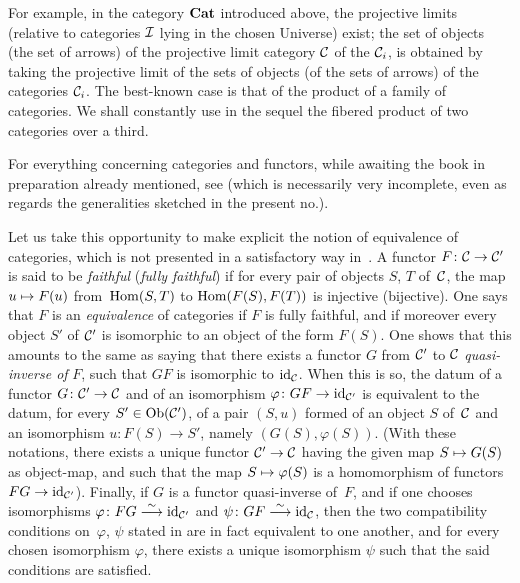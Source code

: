 For example, in the category $\Cat$ introduced above, the
projective limits (relative to categories $\cal{I}$
lying in the chosen Universe) exist; the set of objects
(\resp the set of arrows) of the projective limit
category $\cal{C}$ of the $\cal{C}_i$, is obtained by taking the
projective limit of the sets of objects (\resp of the sets of arrows)
of the categories $\cal{C}_i$. The best-known case is that of the
product of a family of categories. We shall constantly use
in the sequel the fibered product of two categories over a
third.

For everything concerning categories and functors, while
awaiting the book in preparation already mentioned, see
\cite{VI.1} (which is necessarily very incomplete, even as regards
the generalities sketched in the
present no.).

Let us take this opportunity to make explicit the notion of equivalence of
categories,
which is not presented in a satisfactory way
in~\cite{VI.1}. A functor $F\colon\cal{C}\to \cal{C}'$ is said to be
\emph{faithful}
(\resp \emph{fully faithful})
if for every pair of objects $S$, $T$ of~$\cal{C}$, the map
$u\mto F(u)$ from~$\Hom(S,T)$ to $\Hom(F(S),F(T))$ is injective
(\resp bijective). One says that $F$ is an \emph{equivalence} of
categories if
$F$ is fully faithful, and if moreover every object $S'$ of
$\cal{C}'$ is isomorphic to an object of the form $F(S)$. One shows
that this amounts to the same as saying that there exists a functor $G$ from
$\cal{C}'$ to $\cal{C}$ \emph{quasi-inverse of} $F$, \iev such that
$GF$ is isomorphic to $\id_{\cal{C}}$. When this is so, the
datum of a functor $G\colon\cal{C}'\to \cal{C}$ and of an
isomorphism $\varphi\colon GF\to \id_{\cal{C}'}$ is equivalent to
the datum, for every $S'\in\Ob(\cal{C}')$, of a pair $(S,u)$
formed of an object $S$ of~$\cal{C}$ and an isomorphism $u\colon
F(S)\to S'$, namely $(G(S),\varphi(S))$. (With these notations, there exists
a unique functor $\cal{C}'\to\cal{C}$ having the given
map $S\mto G(S)$ as object-map, and such that the map
$S\mto \varphi(S)$ is a homomorphism of functors $FG\to
\id_{\cal{C}'}$). Finally, if $G$ is a functor quasi-inverse of~$F$,
and if one chooses isomorphisms $\varphi\colon
FG\isomto\id_{\cal{C}'}$ and $\psi\colon GF\isomto\id_{\cal{C}}$, then
the two compatibility conditions on~$\varphi$, $\psi$
stated in \cite[I.1.2]{VI.1} are in fact equivalent to one
another, and for every chosen isomorphism $\varphi$, there exists
a unique isomorphism $\psi$ such that the said conditions are
satisfied.

